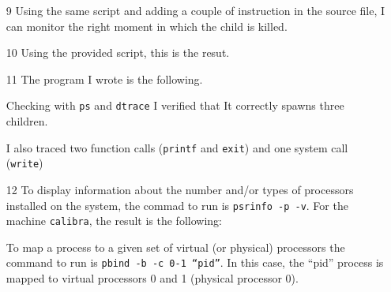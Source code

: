 \documentclass{article}
\begin{document}
\begin{itemize}
\item[9]
Using the same script and adding a couple of instruction in the source file, I can monitor the right moment in which the child is killed.


\item[10]
Using the provided script, this is the resut.


\item[11]
The program I wrote is the following.

Checking with \texttt{ps} and \texttt{dtrace} I verified that It correctly spawns three children.
 
I also traced two function calls (\texttt{printf} and \texttt{exit}) and one system call (\texttt{write})
 


\item[12]
To display information about the number and/or types of processors installed on the system, the commad to run is \texttt{psrinfo -p -v}. For the machine \texttt{calibra}, the result is the following:
 
To map a process to a given set of virtual (or physical) processors the command to run is \texttt{pbind -b -c 0-1 ``pid''}. In this case, the ``pid'' process is mapped to virtual processors 0 and 1 (physical processor 0).

\end{itemize}
\end{document}
